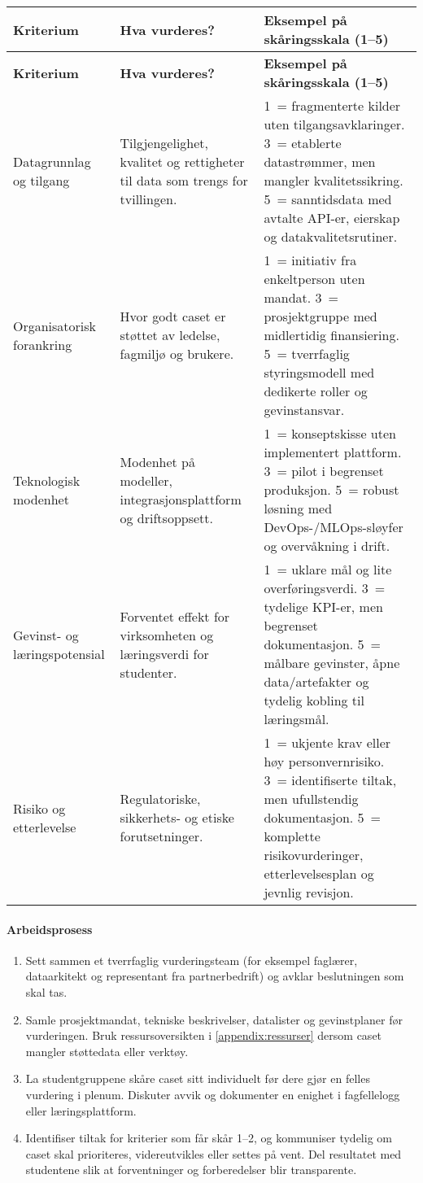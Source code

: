 \begin{longtable}{p{}p{}p{}}
\toprule
\textbf{Kriterium} & \textbf{Hva vurderes?} & \textbf{Eksempel på skåringsskala (1--5)} \\
\midrule
\endfirsthead
\toprule
\textbf{Kriterium} & \textbf{Hva vurderes?} & \textbf{Eksempel på skåringsskala (1--5)} \\
\midrule
\endhead
Datagrunnlag og tilgang & Tilgjengelighet, kvalitet og rettigheter til data som trengs for tvillingen. & 1~= fragmenterte kilder uten tilgangsavklaringer. 3~= etablerte datastrømmer, men mangler kvalitetssikring. 5~= sanntidsdata med avtalte API-er, eierskap og datakvalitetsrutiner. \\
\addlinespace
Organisatorisk forankring & Hvor godt caset er støttet av ledelse, fagmiljø og brukere. & 1~= initiativ fra enkeltperson uten mandat. 3~= prosjektgruppe med midlertidig finansiering. 5~= tverrfaglig styringsmodell med dedikerte roller og gevinstansvar. \\
\addlinespace
Teknologisk modenhet & Modenhet på modeller, integrasjonsplattform og driftsoppsett. & 1~= konseptskisse uten implementert plattform. 3~= pilot i begrenset produksjon. 5~= robust løsning med DevOps-/MLOps-sløyfer og overvåkning i drift. \\
\addlinespace
Gevinst- og læringspotensial & Forventet effekt for virksomheten og læringsverdi for studenter. & 1~= uklare mål og lite overføringsverdi. 3~= tydelige KPI-er, men begrenset dokumentasjon. 5~= målbare gevinster, åpne data/artefakter og tydelig kobling til læringsmål. \\
\addlinespace
Risiko og etterlevelse & Regulatoriske, sikkerhets- og etiske forutsetninger. & 1~= ukjente krav eller høy personvernrisiko. 3~= identifiserte tiltak, men ufullstendig dokumentasjon. 5~= komplette risikovurderinger, etterlevelsesplan og jevnlig revisjon. \\
\bottomrule
\end{longtable}

\paragraph{Arbeidsprosess}
\begin{enumerate}
    \item Sett sammen et tverrfaglig vurderingsteam (for eksempel faglærer, dataarkitekt og representant fra partnerbedrift) og avklar beslutningen som skal tas.
    \item Samle prosjektmandat, tekniske beskrivelser, datalister og gevinstplaner før vurderingen. Bruk ressursoversikten i \autoref{appendix:ressurser} dersom caset mangler støttedata eller verktøy.
    \item La studentgruppene skåre caset sitt individuelt før dere gjør en felles vurdering i plenum. Diskuter avvik og dokumenter en enighet i fagfellelogg eller læringsplattform.
    \item Identifiser tiltak for kriterier som får skår 1--2, og kommuniser tydelig om caset skal prioriteres, videreutvikles eller settes på vent. Del resultatet med studentene slik at forventninger og forberedelser blir transparente.
\end{enumerate}

